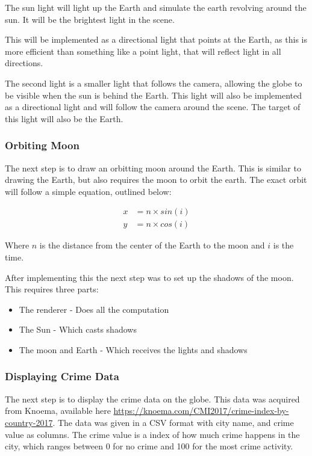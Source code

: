 \documentclass[]{article}
\begin{document}
The sun light will light up the Earth and simulate the earth revolving around the sun.
It will be the brightest light in the scene.

This will be implemented as a directional light that points at the Earth,
as this is more efficient than something like a point light, that will reflect light in all directions.

The second light is a smaller light that follows the camera,
allowing the globe to be visible when the sun is behind the Earth.
This light will also be implemented as a directional light and will follow the camera around the scene.
The target of this light will also be the Earth.

\subsubsection{Orbiting Moon}

The next step is to draw an orbitting moon around the Earth.
This is similar to drawing the Earth, but also requires the moon to orbit the earth.
The exact orbit will follow a simple equation, outlined below:

\begin{align*}
    x &= n \times sin(i)\\
    y &= n \times cos(i)
\end{align*}

Where $n$ is the distance from the center of the Earth to the moon and $i$ is the time.

After implementing this the next step was to set up the shadows of the moon.
This requires three parts:

\begin{itemize}
    \item The renderer - Does all the computation
    \item The Sun - Which casts shadows
    \item The moon and Earth - Which receives the lights and shadows
\end{itemize}

\subsubsection{Displaying Crime Data}

The next step is to display the crime data on the globe.
This data was acquired from Knoema, available here \url{https://knoema.com/CMI2017/crime-index-by-country-2017}.
The data was given in a CSV format with city name, and crime value as columns.
The crime value is a index of how much crime happens in the city, which ranges between
0 for no crime and 100 for the most crime activity.
\end{document}
